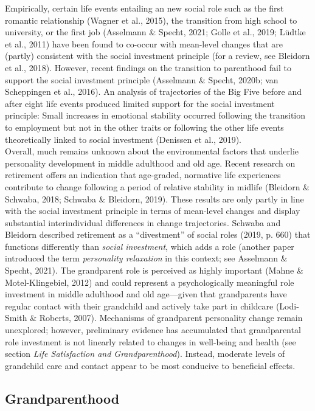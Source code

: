 \documentclass[
  english,
  man,floatsintext]{apa7}
\begin{document}
Empirically, certain life events entailing an new social role such as the first romantic relationship (Wagner et al., 2015), the transition from high school to university, or the first job (Asselmann \& Specht, 2021; Golle et al., 2019; Lüdtke et al., 2011) have been found to co-occur with mean-level changes that are (partly) consistent with the social investment principle (for a review, see Bleidorn et al., 2018). However, recent findings on the transition to parenthood fail to support the social investment principle (Asselmann \& Specht, 2020b; van Scheppingen et al., 2016). An analysis of trajectories of the Big Five before and after eight life events produced limited support for the social investment principle: Small increases in emotional stability occurred following the transition to employment but not in the other traits or following the other life events theoretically linked to social investment (Denissen et al., 2019).\\
Overall, much remains unknown about the environmental factors that underlie personality development in middle adulthood and old age. Recent research on retirement offers an indication that age-graded, normative life experiences contribute to change following a period of relative stability in midlife (Bleidorn \& Schwaba, 2018; Schwaba \& Bleidorn, 2019). These results are only partly in line with the social investment principle in terms of mean-level changes and display substantial interindividual differences in change trajectories. Schwaba and Bleidorn described retirement as a \enquote{divestment} of social roles (2019, p. 660) that functions differently than \emph{social investment}, which adds a role (another paper introduced the term \emph{personality relaxation} in this context; see Asselmann \& Specht, 2021). The grandparent role is perceived as highly important (Mahne \& Motel-Klingebiel, 2012) and could represent a psychologically meaningful role investment in middle adulthood and old age---given that grandparents have regular contact with their grandchild and actively take part in childcare (Lodi-Smith \& Roberts, 2007). Mechanisms of grandparent personality change remain unexplored; however, preliminary evidence has accumulated that grandparental role investment is not linearly related to changes in well-being and health (see section \emph{Life Satisfaction and Grandparenthood}). Instead, moderate levels of grandchild care and contact appear to be most conducive to beneficial effects.

\hypertarget{grandparenthood}{%
\subsection{Grandparenthood}\label{grandparenthood}}
\end{document}
